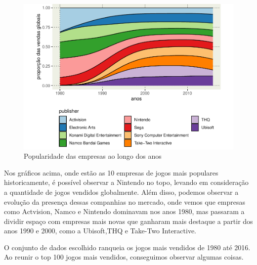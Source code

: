 \documentclass[draft]{agujournal2018}
\begin{document}
\newpage

\begin{figure}[h]
\includegraphics{vendas_de_jogos_de_videogames_files/figure-latex/unnamed-chunk-8-1} \caption{Popularidade das empresas ao longo dos anos}\label{fig:unnamed-chunk-8}
\end{figure}

Nos gráficos acima, onde estão as 10 empresas de jogos mais populares
historicamente, é possível observar a Nintendo no topo, levando em
consideração a quantidade de jogos vendidos globalmente. Além disso,
podemos observar a evolução da presença dessas companhias no mercado,
onde vemos que empresas como Actvision, Namco e Nintendo dominavam nos
anos 1980, mas passaram a dividir espaço com empresas mais novas que
ganharam mais destaque a partir dos anos 1990 e 2000, como a Ubisoft,THQ
e Take-Two Interactive.

\newpage

O conjunto de dados escolhido ranqueia os jogos mais vendidos de 1980
até 2016. Ao reunir o top 100 jogos mais vendidos, conseguimos observar
algumas coisas.
\end{document}
